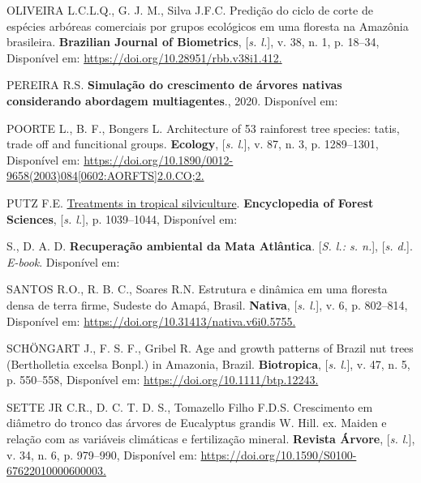 \documentclass[
]{article}
\newlength{\cslhangindent}
\newlength{\cslentryspacingunit} %
\newenvironment{CSLReferences}[2] %
 {%
  \setlength{\parindent}{0pt}
  \ifodd #1
  \let\oldpar\par
  \def\par{\hangindent=\cslhangindent\oldpar}
  \fi
  \setlength{\parskip}{#2\cslentryspacingunit}
 }%
 {}
\begin{document}
\begin{CSLReferences}{0}{1}
\leavevmode{}%
OLIVEIRA L.C.L.Q., G. J. M., Silva J.F.C. Predição do ciclo de corte de
espécies arbóreas comerciais por grupos ecológicos em uma floresta na
Amazônia brasileira. \textbf{Brazilian Journal of Biometrics},
{[}\emph{s. l.}{]}, v. 38, n. 1, p. 18--34, Disponível em:
\href{https://doi.org/10.28951/rbb.v38i1.412}{https://doi.org/10.28951/rbb.v38i1.412.
}

\leavevmode{}%
PEREIRA R.S. \textbf{Simulação do crescimento de árvores nativas
considerando abordagem multiagentes}., 2020. Disponível em:

\leavevmode{}%
POORTE L., B. F., Bongers L. Architecture of 53 rainforest tree species:
tatis, trade off and funcitional groups. \textbf{Ecology}, {[}\emph{s.
l.}{]}, v. 87, n. 3, p. 1289--1301, Disponível em:
\href{https://doi.org/10.1890/0012-9658(2003)084\%5B0602:AORFTS\%5D2.0.CO;2}{https://doi.org/10.1890/0012-9658(2003)084{[}0602:AORFTS{]}2.0.CO;2.
}

\leavevmode{}%
PUTZ F.E. \href{}{Treatments in tropical silviculture}.
\textbf{Encyclopedia of Forest Sciences}, {[}\emph{s. l.}{]}, p.
1039--1044, Disponível em:

\leavevmode{}%
S., D. A. D.\textbf{ Recuperação ambiental da Mata Atlântica}.
{[}\emph{S. l.: s. n.}{]}, {[}\emph{s. d.}{]}. \emph{E-book}. Disponível
em:

\leavevmode{}%
SANTOS R.O., R. B. C., Soares R.N. Estrutura e dinâmica em uma floresta
densa de terra firme, Sudeste do Amapá, Brasil. \textbf{Nativa},
{[}\emph{s. l.}{]}, v. 6, p. 802--814, Disponível em:
\href{https://doi.org/10.31413/nativa.v6i0.5755}{https://doi.org/10.31413/nativa.v6i0.5755.
}

\leavevmode{}%
SCHÖNGART J., F. S. F., Gribel R. Age and growth patterns of Brazil nut
trees (Bertholletia excelsa Bonpl.) in Amazonia, Brazil.
\textbf{Biotropica}, {[}\emph{s. l.}{]}, v. 47, n. 5, p. 550--558,
Disponível em:
\href{https://doi.org/10.1111/btp.12243}{https://doi.org/10.1111/btp.12243.
}

\leavevmode{}%
SETTE JR C.R., D. C. T. D. S., Tomazello Filho F.D.S. Crescimento em
diâmetro do tronco das árvores de Eucalyptus grandis W. Hill. ex. Maiden
e relação com as variáveis climáticas e fertilização mineral.
\textbf{Revista Árvore}, {[}\emph{s. l.}{]}, v. 34, n. 6, p. 979--990,
Disponível em:
\href{https://doi.org/10.1590/S0100-67622010000600003}{https://doi.org/10.1590/S0100-67622010000600003.
}


\end{CSLReferences}
\end{document}
